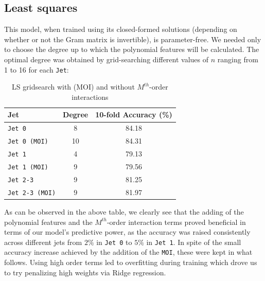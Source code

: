 \documentclass[10pt,conference,compsocconf]{IEEEtran}
\begin{document}
\subsection{Least squares}
This model, when trained using its closed-formed solutions (depending on whether or not the Gram matrix is invertible), is parameter-free. We needed only to choose the degree  up to which the polynomial features will be calculated. The optimal degree was obtained by grid-searching different values of $n$ ranging from 1 to 16 for each \verb+Jet+: 
\vspace{-0.2cm}
\begin{table}[h!]
\centering
\caption{LS gridsearch with (MOI) and without $M^{th}$-order interactions  }
\footnotesize
\begin{tabular}{|l| c|c| } 
 \hline
   Jet & Degree & 10-fold Accuracy (\%)  \\
 \hline
    \verb+Jet 0+  & 8 &  84.18 \\
    \verb+Jet 0 (MOI)+   & 10 &  84.31 \\
    \verb+Jet 1+  & 4 & 79.13 \\
    \verb+Jet 1 (MOI)+  & 9 & 79.56 \\
    \verb+Jet 2-3+  & 9 & 81.25\\
    \verb+Jet 2-3 (MOI)+ & 9 & 81.97\\
  \hline
\end{tabular}
\label{grid_search_ridge_cross}
\end{table}
As can be observed in the above table, we clearly see that the adding of the polynomial features and the $M^{th}$-order interaction terms proved beneficial in terms of our model's predictive power, as the accuracy was raised consistently across different jets from $2\%$ in \verb+Jet 0+  to $5\%$ in \verb+Jet 1+. In spite of the small accuracy increase achieved by the addition of the \verb+MOI+, these were kept in what follows. Using high order terms led to overfitting during training which drove us to try penalizing high weights via Ridge regression. 
\end{document}
